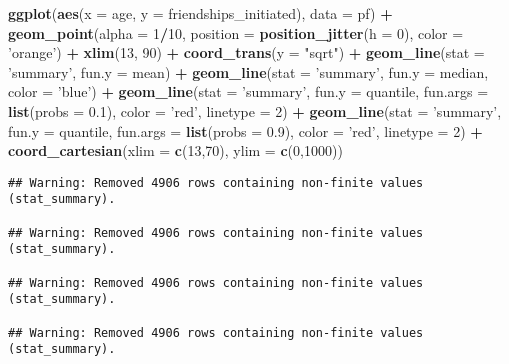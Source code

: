 \documentclass[]{article}
\newenvironment{Shaded}{\begin{snugshade}}{\end{snugshade}}
\newcommand{\KeywordTok}[1]{\textcolor[rgb]{0.13,0.29,0.53}{\textbf{#1}}}
\newcommand{\DataTypeTok}[1]{\textcolor[rgb]{0.13,0.29,0.53}{#1}}
\newcommand{\DecValTok}[1]{\textcolor[rgb]{0.00,0.00,0.81}{#1}}
\newcommand{\FloatTok}[1]{\textcolor[rgb]{0.00,0.00,0.81}{#1}}
\newcommand{\StringTok}[1]{\textcolor[rgb]{0.31,0.60,0.02}{#1}}
\newcommand{\OperatorTok}[1]{\textcolor[rgb]{0.81,0.36,0.00}{\textbf{#1}}}
\newcommand{\NormalTok}[1]{#1}
\begin{document}
\begin{Shaded}
\begin{Highlighting}[]
\KeywordTok{ggplot}\NormalTok{(}\KeywordTok{aes}\NormalTok{(}\DataTypeTok{x =}\NormalTok{ age, }\DataTypeTok{y =}\NormalTok{ friendships_initiated), }\DataTypeTok{data =}\NormalTok{ pf) }\OperatorTok{+}
\StringTok{  }\KeywordTok{geom_point}\NormalTok{(}\DataTypeTok{alpha =} \DecValTok{1}\OperatorTok{/}\DecValTok{10}\NormalTok{, }\DataTypeTok{position =} \KeywordTok{position_jitter}\NormalTok{(}\DataTypeTok{h =} \DecValTok{0}\NormalTok{), }\DataTypeTok{color =} \StringTok{'orange'}\NormalTok{) }\OperatorTok{+}
\StringTok{  }\KeywordTok{xlim}\NormalTok{(}\DecValTok{13}\NormalTok{, }\DecValTok{90}\NormalTok{) }\OperatorTok{+}
\StringTok{  }\KeywordTok{coord_trans}\NormalTok{(}\DataTypeTok{y =} \StringTok{"sqrt"}\NormalTok{) }\OperatorTok{+}
\StringTok{  }\KeywordTok{geom_line}\NormalTok{(}\DataTypeTok{stat =} \StringTok{'summary'}\NormalTok{, }\DataTypeTok{fun.y =}\NormalTok{ mean) }\OperatorTok{+}
\StringTok{  }\KeywordTok{geom_line}\NormalTok{(}\DataTypeTok{stat =} \StringTok{'summary'}\NormalTok{, }\DataTypeTok{fun.y =}\NormalTok{ median, }\DataTypeTok{color =} \StringTok{'blue'}\NormalTok{) }\OperatorTok{+}
\StringTok{  }\KeywordTok{geom_line}\NormalTok{(}\DataTypeTok{stat =} \StringTok{'summary'}\NormalTok{, }\DataTypeTok{fun.y =}\NormalTok{ quantile, }\DataTypeTok{fun.args =} \KeywordTok{list}\NormalTok{(}\DataTypeTok{probs =} \FloatTok{0.1}\NormalTok{), }\DataTypeTok{color =} \StringTok{'red'}\NormalTok{, }\DataTypeTok{linetype =} \DecValTok{2}\NormalTok{) }\OperatorTok{+}
\StringTok{  }\KeywordTok{geom_line}\NormalTok{(}\DataTypeTok{stat =} \StringTok{'summary'}\NormalTok{, }\DataTypeTok{fun.y =}\NormalTok{ quantile, }\DataTypeTok{fun.args =} \KeywordTok{list}\NormalTok{(}\DataTypeTok{probs =} \FloatTok{0.9}\NormalTok{), }\DataTypeTok{color =} \StringTok{'red'}\NormalTok{, }\DataTypeTok{linetype =} \DecValTok{2}\NormalTok{) }\OperatorTok{+}
\StringTok{  }\KeywordTok{coord_cartesian}\NormalTok{(}\DataTypeTok{xlim =} \KeywordTok{c}\NormalTok{(}\DecValTok{13}\NormalTok{,}\DecValTok{70}\NormalTok{), }\DataTypeTok{ylim =} \KeywordTok{c}\NormalTok{(}\DecValTok{0}\NormalTok{,}\DecValTok{1000}\NormalTok{))}
\end{Highlighting}
\end{Shaded}

\begin{verbatim}
## Warning: Removed 4906 rows containing non-finite values (stat_summary).

## Warning: Removed 4906 rows containing non-finite values (stat_summary).

## Warning: Removed 4906 rows containing non-finite values (stat_summary).

## Warning: Removed 4906 rows containing non-finite values (stat_summary).
\end{verbatim}
\end{document}
